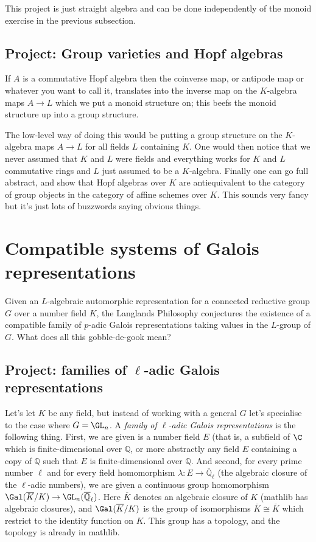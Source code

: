 \documentclass{amsart}
\newcommand{\Q}{\mathbb{Q}}
\begin{document}
This project is just straight algebra and can be done independently of the monoid exercise in the previous subsection.

\subsection{Project: Group varieties and Hopf algebras}

If $A$ is a commutative Hopf algebra then the coinverse map, or antipode map or whatever you want to call it, translates into the inverse map on the $K$-algebra maps $A\to L$ which we put a monoid structure on; this beefs the monoid structure up into a group structure.

The low-level way of doing this would be putting a group structure on the $K$-algebra maps $A\to L$ for all fields $L$ containing $K$. One would then notice that we never assumed that $K$ and $L$ were fields and everything works for $K$ and $L$ commutative rings and $L$ just assumed to be a $K$-algebra. Finally one can go full abstract, and show that Hopf algebras over $K$ are antiequivalent to the category of group objects in the category of affine schemes over $K$. This sounds very fancy but it's just lots of buzzwords saying obvious things.

\section{Compatible systems of Galois representations}

Given an $L$-algebraic automorphic representation for a connected reductive group $G$ over a number field $K$, the Langlands Philosophy conjectures the existence of a compatible family of $p$-adic Galois representations taking values in the $L$-group of $G$. What does all this gobble-de-gook mean?

\subsection{Project: families of $\ell$-adic Galois representations}

Let's let $K$ be any field, but instead of working with a general $G$ let's specialise to the case where $G=\GL_n$. A \emph{family of $\ell$-adic Galois representations} is the following thing. First, we are given is a number field $E$ (that is, a subfield of $\C$ which is finite-dimensional over $\Q$, or more abstractly any field $E$ containing a copy of $\Q$ such that $E$ is finite-dimensional over $\Q$. And second, for every prime number $\ell$ and for every field homomorphism $\lambda:E\to\overline{\Q}_\ell$ (the algebraic closure of the $\ell$-adic numbers), we are given a continuous group homomorphism $\Gal(\overline{K}/K)\to\GL_n(\overline{\Q}_\ell)$. Here $\overline{K}$ denotes an algebraic closure of $K$ (mathlib has algebraic closures), and $\Gal(\overline{K}/K)$ is the group of isomorphisms $\overline{K}\cong\overline{K}$ which restrict to the identity function on $K$. This group has a topology, and the topology is already in mathlib.
\end{document}
